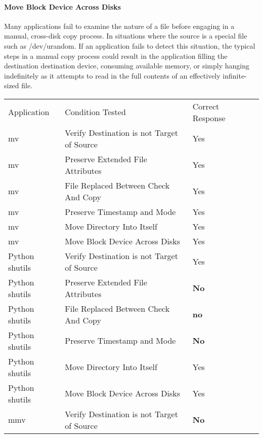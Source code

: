         \paragraph{Move Block Device Across Disks}

        Many applications fail to examine the nature of a file before engaging in a manual, cross-disk copy process.  In
        situations where the source is a special file such as /dev/urandom.  If an application fails to detect this
        situation, the typical steps in a manual copy process could result in the application filling the destination
        destination device, consuming available memory, or simply hanging indefinitely as it attempts to read in the
        full contents of an effectively infinite-sized file.

        
            \begin{table}[H]
                \scriptsize{}
                \begin{tabular}{l  l  l  l}
                \toprule{}
                  Application & Condition Tested & Correct Response\\
                  mv & Verify Destination is not Target of Source & Yes\\
                  mv & Preserve Extended File Attributes & Yes\\
                  mv & File Replaced Between Check And Copy & Yes\\
                  mv & Preserve Timestamp and Mode & Yes\\
                  mv & Move Directory Into Itself & Yes\\
                  mv & Move Block Device Across Disks & Yes\\
                  Python shutils & Verify Destination is not Target of Source & Yes\\
                  Python shutils & Preserve Extended File Attributes & \textbf{No}\\
                  Python shutils  & File Replaced Between Check And Copy & \textbf{no}\\
                  Python shutils  & Preserve Timestamp and Mode & \textbf{No}\\
                  Python shutils  & Move Directory Into Itself & Yes\\
                  Python shutils  & Move Block Device Across Disks & Yes\\
                  mmv & Verify Destination is not Target of Source& \textbf{No}\\

\end{tabular}
\end{table}
